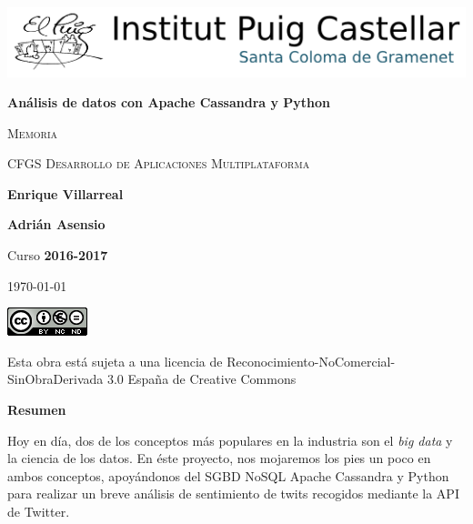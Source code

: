 \documentclass[12pt,a4paper,oneside,fleqn]{tmarticle}
\begin{document}
\pagestyle{fancy}
\begin{titlepage}
	\centering
        \includegraphics[scale=0.75]{puiglogo.png}\par\vspace{1,5cm}
            {\huge\bfseries Análisis de datos con Apache Cassandra y Python\par}
	\vspace{0.5cm}
	    {\scshape\Large Memoria\par}
	\vspace{0.5cm}
	    {\scshape\Large CFGS Desarrollo de Aplicaciones Multiplataforma\par}
	\vspace{6.0cm}
  \hfill{\Large\textbf{Enrique Villarreal}}\par
  \vspace{0.1cm}
  \hfill{\Large\textbf{Adrián Asensio}}\par  
        \vspace{1.5cm}
            \hfill{\large Curso \textbf{2016-2017}\par}
            \hfill{\large\today\par}
         \vspace{2cm}
         \begin{flushright}

        \includegraphics[scale=0.75]{creativecommons.png}\par\vspace{0.05cm}

           Esta obra está sujeta a una licencia de Reconocimiento-NoComercial-SinObraDerivada 3.0 España de Creative Commons
         \end{flushright}
        \vfill
\end{titlepage}
\thispagestyle{empty}
\textbf{Resumen}
\vspace{0.5cm}

Hoy en día, dos de los conceptos más populares en la industria son el \emph{big data} y la ciencia de los datos. En éste proyecto, nos mojaremos los
pies un poco en ambos conceptos, apoyándonos del SGBD NoSQL Apache Cassandra y
Python para realizar un breve análisis de sentimiento de twits recogidos
mediante la API de Twitter.
\end{document}
